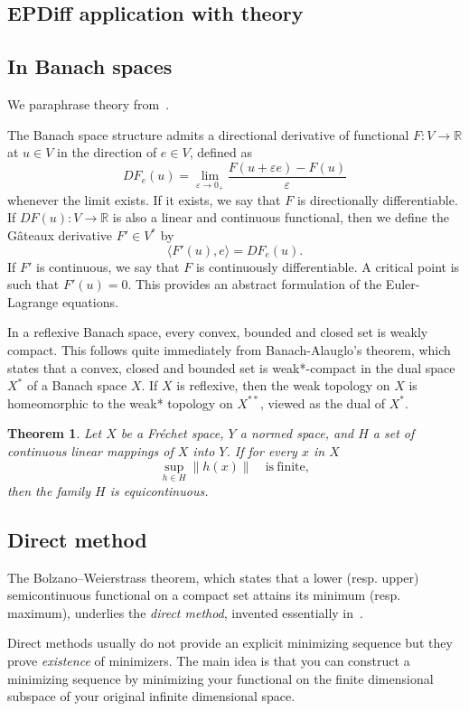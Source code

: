 \documentclass{article}
\theoremstyle{plain}
\newtheorem{teo}{Theorem}[section]
\theoremstyle{definition}
\numberwithin{equation}{section}
\newcommand{\R}{\ensuremath{\mathbb{R}}}
\begin{document}
\subsection{EPDiff application with theory}



\subsection{In Banach spaces}
We paraphrase theory from~\cite[Chapter 17]{grinfeld2014mathematical}.

The Banach space structure admits a directional derivative of functional $F:V\to\R$ at $u\in V$ in the direction of $e\in V$, defined as
\[
DF_e(u) = \lim_{\varepsilon\to 0_+}\frac{F(u+\varepsilon e)-F(u)}{\varepsilon}
\]
whenever the limit exists. If it exists, we say that $F$ is directionally differentiable. If $DF(u):V\to\R$ is also a linear and continuous functional, then we define the Gâteaux derivative $F'\in V^*$ by
\[
\langle F'(u),e\rangle=DF_e(u).
\]
If $F'$ is  continuous, we say that $F$ is  continuously differentiable. A critical point is such that $F'(u)=0$. This provides an abstract formulation of the Euler-Lagrange equations.


In a reflexive Banach space, every convex, bounded and closed set is weakly compact. This follows quite immediately from Banach-Alauglo's theorem, which states that a convex, closed and bounded set is weak*-compact in the dual space $X^*$ of a Banach space $X$. If $X$ is reflexive, then the weak topology on $X$ is homeomorphic to the weak* topology on  $X^{**}$, viewed as the dual of $X^*$. 

\begin{teo}
Let $X$ be a Fréchet space, $Y$ a normed space, and $H$ a set of continuous linear mappings of $X$ into $Y$. If for every $x$ in $X$
\[
\sup_{h\in H} \|h(x)\|\quad\mathrm{is\ finite,}
\]
then the family $H$ is equicontinuous.
\end{teo}

\subsection{Direct method}
The Bolzano–Weierstrass theorem, which states that a lower (resp. upper) semicontinuous functional on a compact set attains its minimum (resp. maximum), underlies the \textit{direct method}, invented essentially in~\cite{tonelli1915methode}.

Direct methods usually do not provide an explicit minimizing sequence but they prove \textit{existence} of minimizers.  The main idea is that you can construct a minimizing sequence by minimizing your functional on the finite dimensional subspace of your original infinite dimensional space.
\end{document}
